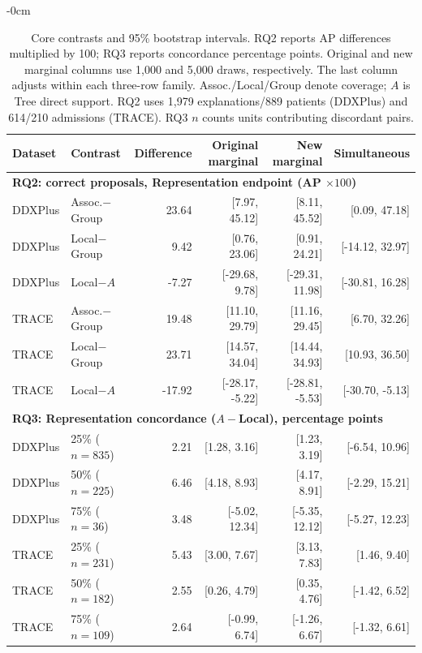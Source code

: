 \begin{table}[!htbp]
\begin{adjustwidth}{-\extralength}{0cm}
\centering\footnotesize\setlength{\tabcolsep}{4pt}
\caption{Core contrasts and 95\% bootstrap intervals. RQ2 reports AP differences multiplied by 100; RQ3 reports concordance percentage points. Original and new marginal columns use 1,000 and 5,000 draws, respectively. The last column adjusts within each three-row family. Assoc./Local/Group denote coverage; $A$ is Tree direct support. RQ2 uses 1,979 explanations/889 patients (DDXPlus) and 614/210 admissions (TRACE). RQ3 $n$ counts units contributing discordant pairs.}\label{tab:simultaneous-contrasts}
\begin{tabular}{llrrrr}\toprule
Dataset & Contrast & Difference & Original marginal & New marginal & Simultaneous\\\midrule
\multicolumn{6}{l}{\textbf{RQ2: correct proposals, Representation endpoint (AP $\times100$)}}\\
DDXPlus & Assoc.$-$Group & 23.64 & [7.97, 45.12] & [8.11, 45.52] & [0.09, 47.18] \\
DDXPlus & Local$-$Group & 9.42 & [0.76, 23.06] & [0.91, 24.21] & [-14.12, 32.97] \\
DDXPlus & Local$-A$ & -7.27 & [-29.68, 9.78] & [-29.31, 11.98] & [-30.81, 16.28] \\
\addlinespace
TRACE & Assoc.$-$Group & 19.48 & [11.10, 29.79] & [11.16, 29.45] & [6.70, 32.26] \\
TRACE & Local$-$Group & 23.71 & [14.57, 34.04] & [14.44, 34.93] & [10.93, 36.50] \\
TRACE & Local$-A$ & -17.92 & [-28.17, -5.22] & [-28.81, -5.53] & [-30.70, -5.13] \\
\midrule\multicolumn{6}{l}{\textbf{RQ3: Representation concordance ($A-$Local), percentage points}}\\
DDXPlus & 25\% ($n=835$) & 2.21 & [1.28, 3.16] & [1.23, 3.19] & [-6.54, 10.96] \\
DDXPlus & 50\% ($n=225$) & 6.46 & [4.18, 8.93] & [4.17, 8.91] & [-2.29, 15.21] \\
DDXPlus & 75\% ($n=36$) & 3.48 & [-5.02, 12.34] & [-5.35, 12.12] & [-5.27, 12.23] \\
\addlinespace
TRACE & 25\% ($n=231$) & 5.43 & [3.00, 7.67] & [3.13, 7.83] & [1.46, 9.40] \\
TRACE & 50\% ($n=182$) & 2.55 & [0.26, 4.79] & [0.35, 4.76] & [-1.42, 6.52] \\
TRACE & 75\% ($n=109$) & 2.64 & [-0.99, 6.74] & [-1.26, 6.67] & [-1.32, 6.61] \\
\bottomrule\end{tabular}
\end{adjustwidth}
\end{table}
